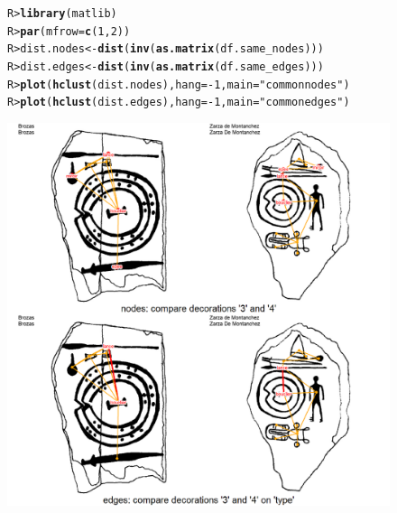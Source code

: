 \documentclass[article]{jss}\usepackage[]{graphicx}\usepackage[]{color}
\makeatletter
\def\maxwidth{ %
  \ifdim\Gin@nat@width>\linewidth
    \linewidth
  \else
    \Gin@nat@width
  \fi
}
\newcommand{\hlnum}[1]{\textcolor[rgb]{0.686,0.059,0.569}{#1}}%
\newcommand{\hlstr}[1]{\textcolor[rgb]{0.192,0.494,0.8}{#1}}%
\newcommand{\hlopt}[1]{\textcolor[rgb]{0,0,0}{#1}}%
\newcommand{\hlstd}[1]{\textcolor[rgb]{0.345,0.345,0.345}{#1}}%
\newcommand{\hlkwb}[1]{\textcolor[rgb]{0.69,0.353,0.396}{#1}}%
\newcommand{\hlkwc}[1]{\textcolor[rgb]{0.333,0.667,0.333}{#1}}%
\newcommand{\hlkwd}[1]{\textcolor[rgb]{0.737,0.353,0.396}{\textbf{#1}}}%
\newenvironment{kframe}{%
 \def\at@end@of@kframe{}%
 \ifinner\ifhmode%
  \def\at@end@of@kframe{\end{minipage}}%
  \begin{minipage}{\columnwidth}%
 \fi\fi%
 \def\FrameCommand##1{\hskip\@totalleftmargin \hskip-\fboxsep
 \colorbox{shadecolor}{##1}\hskip-\fboxsep
     \hskip-\linewidth \hskip-\@totalleftmargin \hskip\columnwidth}%
 \MakeFramed {\advance\hsize-\width
   \@totalleftmargin\z@ \linewidth\hsize
   \@setminipage}}%
 {\par\unskip\endMakeFramed%
 \at@end@of@kframe}
\newenvironment{knitrout}{}{} %
\makeatother
\begin{document}
\begin{figure}[H]
\begin{knitrout}
\color{fgcolor}\begin{kframe}
\begin{alltt}
\hlstd{R> }\hlkwd{library}\hlstd{(matlib)}
\hlstd{R> }\hlkwd{par}\hlstd{(}\hlkwc{mfrow}\hlstd{=}\hlkwd{c}\hlstd{(}\hlnum{1}\hlstd{,}\hlnum{2}\hlstd{))}
\hlstd{R> }\hlstd{dist.nodes}  \hlkwb{<-} \hlkwd{dist}\hlstd{(}\hlkwd{inv}\hlstd{(}\hlkwd{as.matrix}\hlstd{(df.same_nodes)))}
\hlstd{R> }\hlstd{dist.edges}  \hlkwb{<-} \hlkwd{dist}\hlstd{(}\hlkwd{inv}\hlstd{(}\hlkwd{as.matrix}\hlstd{(df.same_edges)))}
\hlstd{R> }\hlkwd{plot}\hlstd{(}\hlkwd{hclust}\hlstd{(dist.nodes),} \hlkwc{hang} \hlstd{=} \hlopt{-}\hlnum{1}\hlstd{,} \hlkwc{main} \hlstd{=} \hlstr{"common nodes"}\hlstd{)}
\hlstd{R> }\hlkwd{plot}\hlstd{(}\hlkwd{hclust}\hlstd{(dist.edges),} \hlkwc{hang} \hlstd{=} \hlopt{-}\hlnum{1}\hlstd{,} \hlkwc{main} \hlstd{=} \hlstr{"common edges"}\hlstd{)}
\end{alltt}
\end{kframe}
\includegraphics[width=\maxwidth]{figure/unnamed-chunk-17-1} 

\end{knitrout}
\end{figure}
\end{document}
